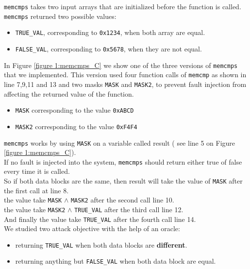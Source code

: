 \texttt{memcmps} takes two input arrays that are initialized before the function is called.\\
\texttt{memcmps} returned two possible values:\\
\begin{itemize}
    \item \texttt{TRUE\_VAL}, corresponding to \texttt{0x1234}, when both array are equal.
    \item \texttt{FALSE\_VAL}, corresponding to \texttt{0x5678}, when they are not equal.
\end{itemize}
\vspace{0.5cm}

In Figure \ref{figure 1:memcmps_C} we show one of the three versions of \texttt{memcmps} that we implemented.
This version used four function calls of \texttt{memcmp}  as shown in line 7,9,11 and 13 and two masks \texttt{MASK} and \texttt{MASK2}, to prevent fault injection from affecting the returned value of the function.
\begin{itemize}
    \item \texttt{MASK} corresponding to the value \texttt{0xABCD}
    \item \texttt{MASK2} corresponding to the value \texttt{0xF4F4}
\end{itemize}
\vspace{0.5cm}

\texttt{memcmps} works by using \texttt{MASK} on a variable called result ( see line 5 on Figure \ref{figure 1:memcmps_C}).\\
If no fault is injected into the system, \texttt{memcmps} should return either true of false every time it is called.\\
So if both data blocks are the same, then result will take the value of \texttt{MASK} after the first call at line 8.\\
the value take \texttt{MASK} $\land$ \texttt{MASK2} after the second call line 10.\\
the value take \texttt{MASK2} $\land$ \texttt{TRUE\_VAL} after the third call line 12.\\
And finally the value take \texttt{TRUE\_VAL} after the fourth call line 14.\\

We studied two attack objective with the help of an oracle:

\begin{itemize}
    \item returning \texttt{TRUE\_VAL} when both data blocks are \textbf{different}.
    \item returning anything but \texttt{FALSE\_VAL} when both data block are equal. 
\end{itemize}

